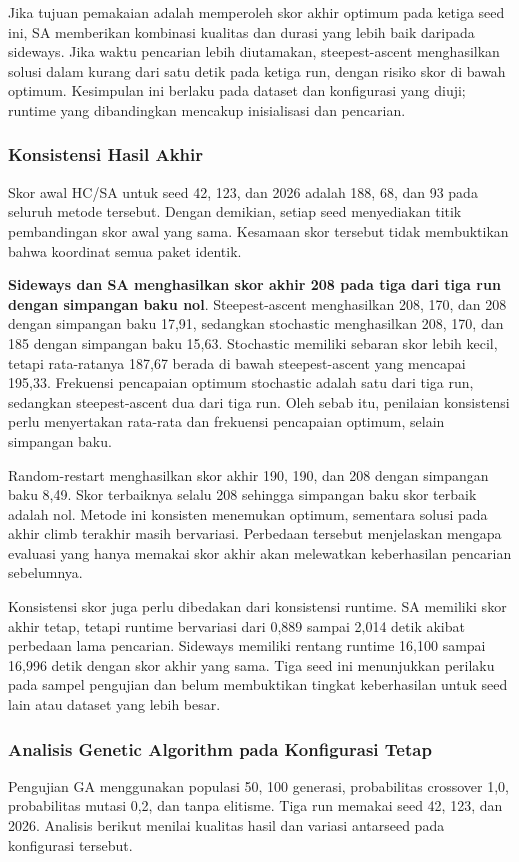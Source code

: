 \documentclass[12pt,a4paper]{article}
\begin{document}
Jika tujuan pemakaian adalah memperoleh skor akhir optimum pada ketiga seed ini, SA memberikan kombinasi kualitas dan durasi yang lebih baik daripada sideways. Jika waktu pencarian lebih diutamakan, steepest-ascent menghasilkan solusi dalam kurang dari satu detik pada ketiga run, dengan risiko skor di bawah optimum. Kesimpulan ini berlaku pada dataset dan konfigurasi yang diuji; runtime yang dibandingkan mencakup inisialisasi dan pencarian.

\subsubsection{Konsistensi Hasil Akhir}
Skor awal HC/SA untuk seed 42, 123, dan 2026 adalah 188, 68, dan 93 pada seluruh metode tersebut. Dengan demikian, setiap seed menyediakan titik pembandingan skor awal yang sama. Kesamaan skor tersebut tidak membuktikan bahwa koordinat semua paket identik.

\textbf{Sideways dan SA menghasilkan skor akhir 208 pada tiga dari tiga run dengan simpangan baku nol}. Steepest-ascent menghasilkan 208, 170, dan 208 dengan simpangan baku 17,91, sedangkan stochastic menghasilkan 208, 170, dan 185 dengan simpangan baku 15,63. Stochastic memiliki sebaran skor lebih kecil, tetapi rata-ratanya 187,67 berada di bawah steepest-ascent yang mencapai 195,33. Frekuensi pencapaian optimum stochastic adalah satu dari tiga run, sedangkan steepest-ascent dua dari tiga run. Oleh sebab itu, penilaian konsistensi perlu menyertakan rata-rata dan frekuensi pencapaian optimum, selain simpangan baku.

Random-restart menghasilkan skor akhir 190, 190, dan 208 dengan simpangan baku 8,49. Skor terbaiknya selalu 208 sehingga simpangan baku skor terbaik adalah nol. Metode ini konsisten menemukan optimum, sementara solusi pada akhir climb terakhir masih bervariasi. Perbedaan tersebut menjelaskan mengapa evaluasi yang hanya memakai skor akhir akan melewatkan keberhasilan pencarian sebelumnya.

Konsistensi skor juga perlu dibedakan dari konsistensi runtime. SA memiliki skor akhir tetap, tetapi runtime bervariasi dari 0,889 sampai 2,014 detik akibat perbedaan lama pencarian. Sideways memiliki rentang runtime 16,100 sampai 16,996 detik dengan skor akhir yang sama. Tiga seed ini menunjukkan perilaku pada sampel pengujian dan belum membuktikan tingkat keberhasilan untuk seed lain atau dataset yang lebih besar.

\subsubsection{Analisis Genetic Algorithm pada Konfigurasi Tetap}
Pengujian GA menggunakan populasi 50, 100 generasi, probabilitas crossover 1,0, probabilitas mutasi 0,2, dan tanpa elitisme. Tiga run memakai seed 42, 123, dan 2026. Analisis berikut menilai kualitas hasil dan variasi antarseed pada konfigurasi tersebut.
\end{document}
